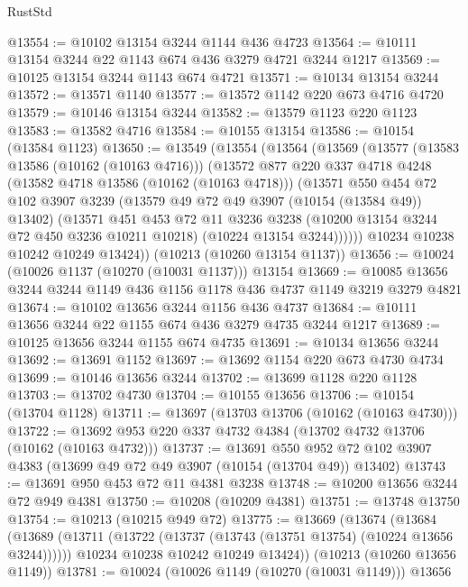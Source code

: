 \begin{lexlean}{RustStd}
\begin{coremodule}
{\begin{coremodule}
{{{{{{{{{{{{{{{{{{{{{{{{{{@13554 := @10102 @13154 @3244 @1144 @436 @4723
@13564 := @10111 @13154 @3244 @22 @1143 @674 @436 @3279 @4721 @3244 @1217
@13569 := @10125 @13154 @3244 @1143 @674 @4721
@13571 := @10134 @13154 @3244
@13572 := @13571 @1140
@13577 := @13572 @1142 @220 @673 @4716 @4720
@13579 := @10146 @13154 @3244
@13582 := @13579 @1123 @220 @1123
@13583 := @13582 @4716
@13584 := @10155 @13154
@13586 := @10154 (@13584 @1123)
@13650 := @13549
    (@13554
      (@13564
        (@13569
          (@13577
            (@13583 @13586 (@10162 (@10163 @4716)))
            (@13572
              @877
              @220
              @337
              @4718
              @4248
              (@13582 @4718 @13586 (@10162 (@10163 @4718)))
              (@13571
                @550
                @454
                @72
                @102
                @3907
                @3239
                (@13579 @49 @72 @49 @3907 (@10154 (@13584 @49)) @13402)
                (@13571
                  @451
                  @453
                  @72
                  @11
                  @3236
                  @3238
                  (@10200 @13154 @3244 @72 @450 @3236 @10211 @10218)
                  (@10224 @13154 @3244))))))
        @10234
        @10238
        @10242
        @10249
        @13424))
    (@10213 (@10260 @13154 @1137))
@13656 := @10024 (@10026 @1137 (@10270 (@10031 @1137))) @13154
@13669 := @10085 @13656 @3244 @3244 @1149 @436 @1156 @1178 @436 @4737 @1149 @3219 @3279 @4821
@13674 := @10102 @13656 @3244 @1156 @436 @4737
@13684 := @10111 @13656 @3244 @22 @1155 @674 @436 @3279 @4735 @3244 @1217
@13689 := @10125 @13656 @3244 @1155 @674 @4735
@13691 := @10134 @13656 @3244
@13692 := @13691 @1152
@13697 := @13692 @1154 @220 @673 @4730 @4734
@13699 := @10146 @13656 @3244
@13702 := @13699 @1128 @220 @1128
@13703 := @13702 @4730
@13704 := @10155 @13656
@13706 := @10154 (@13704 @1128)
@13711 := @13697 (@13703 @13706 (@10162 (@10163 @4730)))
@13722 := @13692 @953 @220 @337 @4732 @4384 (@13702 @4732 @13706 (@10162 (@10163 @4732)))
@13737 := @13691
    @550
    @952
    @72
    @102
    @3907
    @4383
    (@13699 @49 @72 @49 @3907 (@10154 (@13704 @49)) @13402)
@13743 := @13691 @950 @453 @72 @11 @4381 @3238
@13748 := @10200 @13656 @3244 @72 @949 @4381
@13750 := @10208 (@10209 @4381)
@13751 := @13748 @13750
@13754 := @10213 (@10215 @949 @72)
@13775 := @13669
    (@13674
      (@13684
        (@13689 (@13711 (@13722 (@13737 (@13743 (@13751 @13754) (@10224 @13656 @3244))))))
        @10234
        @10238
        @10242
        @10249
        @13424))
    (@10213 (@10260 @13656 @1149))
@13781 := @10024 (@10026 @1149 (@10270 (@10031 @1149))) @13656
}}}}}}}}}}}}}}}}}}}}}}}}}}
\end{coremodule}}
\end{coremodule}
\end{lexlean}
